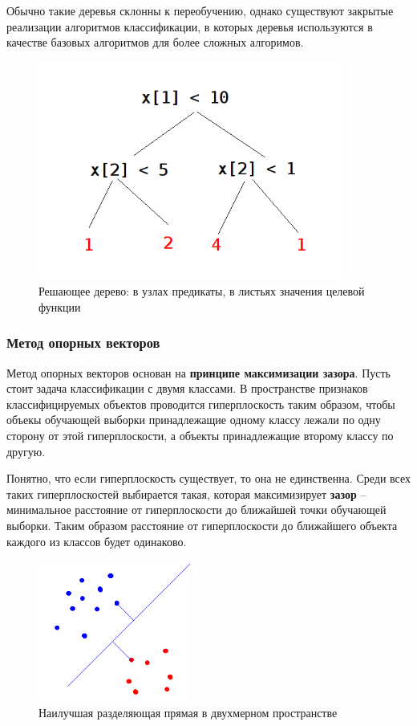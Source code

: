Обычно такие деревья склонны к переобучению, однако существуют закрытые реализации алгоритмов классификации, в которых деревья используются в качестве базовых алгоритмов для более сложных алгоримов.
\begin{figure}[h]
\begin{center}
\includegraphics[width=10cm]{img/d_tree}
\end{center}
\caption{Решающее дерево: в узлах предикаты, в листьях значения целевой функции}
\label{d_tree}
\end{figure}

\subsubsection{Метод опорных векторов}
Метод опорных векторов основан на \textbf{принципе максимизации зазора}. Пусть стоит задача классификации с двумя классами. В пространстве признаков классифицируемых объектов проводится гиперплоскость таким образом, чтобы объекы обучающей выборки принадлежащие одному классу лежали по одну сторону от этой гиперплоскости, а объекты принадлежащие второму классу по другую.

Понятно, что если гиперплоскость существует, то она не единственна. Среди всех таких гиперплоскостей выбирается такая, которая максимизирует \textbf{зазор} -- минимальное расстояние от гиперплоскости до ближайшей точки обучающей выборки. Таким образом расстояние от гиперплоскости до ближайшего объекта каждого из классов будет одинаково.

\begin{figure}[h]
\begin{center}
\includegraphics[width=5cm]{img/svm}
\end{center}
\caption{Наилучшая разделяющая прямая в двухмерном пространстве}
\label{svm}
\end{figure}

